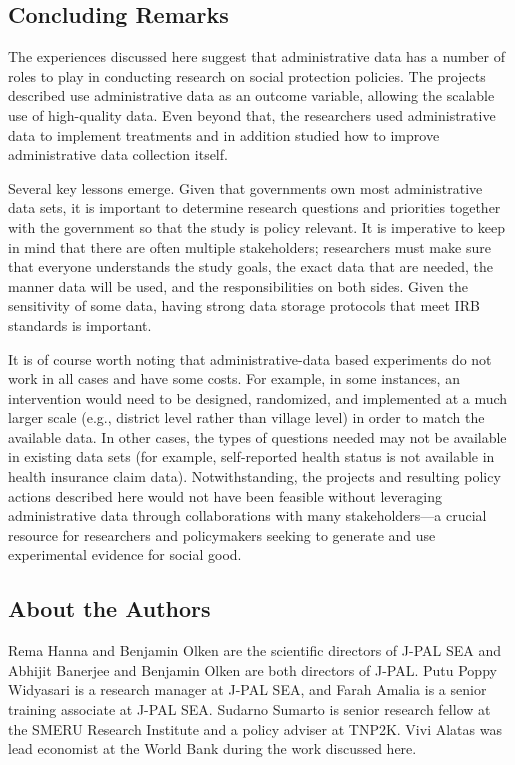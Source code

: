 \documentclass[
]{WileySix}
\begin{document}
\hypertarget{concluding-remarks-5}{%
\subsection{Concluding Remarks}\label{concluding-remarks-5}}

The experiences discussed here suggest that administrative data has a number of roles to play in conducting research on social protection policies. The projects described use administrative data as an outcome variable, allowing the scalable use of high-quality data. Even beyond that, the researchers used administrative data to implement treatments and in addition studied how to improve administrative data collection itself.

Several key lessons emerge. Given that governments own most administrative data sets, it is important to determine research questions and priorities together with the government so that the study is policy relevant. It is imperative to keep in mind that there are often multiple stakeholders; researchers must make sure that everyone understands the study goals, the exact data that are needed, the manner data will be used, and the responsibilities on both sides. Given the sensitivity of some data, having strong data storage protocols that meet IRB standards is important.

It is of course worth noting that administrative-data based experiments do not work in all cases and have some costs. For example, in some instances, an intervention would need to be designed, randomized, and implemented at a much larger scale (e.g., district level rather than village level) in order to match the available data. In other cases, the types of questions needed may not be available in existing data sets (for example, self-reported health status is not available in health insurance claim data). Notwithstanding, the projects and resulting policy actions described here would not have been feasible without leveraging administrative data through collaborations with many stakeholders---a crucial resource for researchers and policymakers seeking to generate and use experimental evidence for social good.

\hypertarget{about-the-authors-9}{%
\subsection*{About the Authors}\label{about-the-authors-9}}

Rema Hanna and Benjamin Olken are the scientific directors of J-PAL SEA and Abhijit Banerjee and Benjamin Olken are both directors of J-PAL. Putu Poppy Widyasari is a research manager at J-PAL SEA, and Farah Amalia is a senior training associate at J-PAL SEA. Sudarno Sumarto is senior research fellow at the SMERU Research Institute and a policy adviser at TNP2K. Vivi Alatas was lead economist at the World Bank during the work discussed here.
\end{document}
